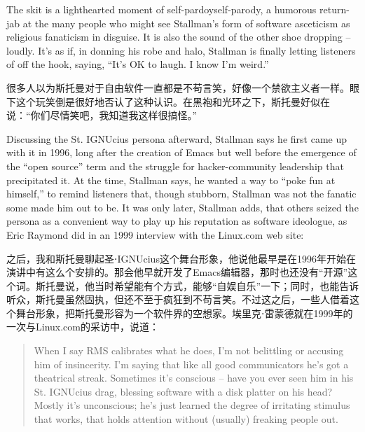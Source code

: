 \ifdefined\eng
The skit is a lighthearted moment of \ifdefined\vone self-pardoy\fi\ifdefined\vtwo self-parody\fi, a humorous return-jab at the many people who might see Stallman's form of software asceticism as religious fanaticism in disguise. It is also the sound of the other shoe dropping -- loudly. It's as if, in donning his robe and halo, Stallman is finally letting listeners \ifdefined\vone of \fi\ifdefined\vtwo off \fi the hook, saying, ``It's OK to laugh. I know I'm weird.''  \ifdefined{}\fi
\fi

\ifdefined\chs
很多人以为斯托曼对于自由软件一直都是不苟言笑，好像一个禁欲主义者一样。眼下这个玩笑倒是很好地否认了这种认识。在黑袍和光环之下，斯托曼好似在说：``你们尽情笑吧，我知道我这样很搞怪\ifdefined{}\fi。''
\fi

\ifdefined\eng
Discussing the St. IGNUcius persona afterward, Stallman says he first came up with it in 1996, long after the creation of Emacs but well before the emergence of the ``open source'' term and the struggle for hacker-community leadership that precipitated it. At the time, Stallman says, he wanted a way to ``poke fun at himself,'' to remind listeners that, though stubborn, Stallman was not the fanatic some made him out to be. It was only later, Stallman adds, that others seized the persona as a convenient way to play up his reputation as software ideologue, as Eric Raymond did in an 1999 interview with the Linux.com web site:
\fi

\ifdefined\chs
之后，我和斯托曼聊起圣⋅IGNUcius这个舞台形象，他说他最早是在1996年开始在演讲中有这么个安排的。那会他早就开发了Emacs编辑器，那时也还没有``开源''这个词。斯托曼说，他当时希望能有个方式，能够``自娱自乐''一下；同时，也能告诉听众，斯托曼虽然固执，但还不至于疯狂到不苟言笑。不过这之后，一些人借着这个舞台形象，把斯托曼形容为一个软件界的空想家。埃里克⋅雷蒙德就在1999年的一次与Linux.com的采访中，说道：
\fi

\ifdefined\eng
\begin{quote}
When I say RMS calibrates what he does, I'm not belittling or accusing him of insincerity. I'm saying that like all good communicators he's got a theatrical streak. Sometimes it's conscious -- have you ever seen him in his St. IGNUcius drag, blessing software with a disk platter on his head? Mostly it's unconscious; he's just learned the degree of irritating stimulus that works, that holds attention without (usually) freaking people out.
\end{quote}
\fi

